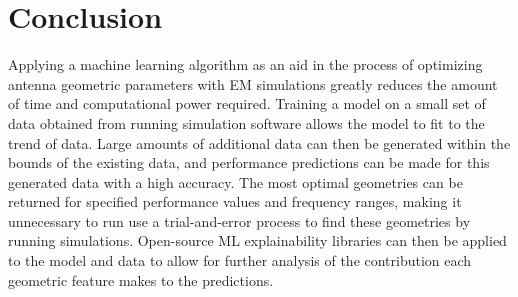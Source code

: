 \documentclass[conference]{IEEEtran}
\begin{document}
\section{Conclusion}
Applying a machine learning algorithm as an aid in the process of optimizing antenna geometric parameters with EM simulations greatly reduces the amount of time and computational power required. Training a model on a small set of data obtained from running simulation software allows the model to fit to the trend of data. Large amounts of additional data can then be generated within the bounds of the existing data, and performance predictions can be made for this generated data with a high accuracy. The most optimal geometries can be returned for specified performance values and frequency ranges, making it unnecessary to run use a trial-and-error process to find these geometries by running simulations. Open-source ML explainability libraries can then be applied to the model and data to allow for further analysis of the contribution each geometric feature makes to the predictions. 



\end{document}
